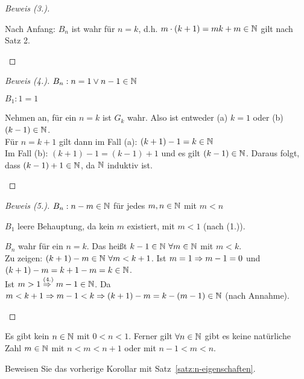 \begin{satz}
\begin{proof}[Beweis (3.)]
\begin{induktionsschritt}
            Nach Anfang: $B_n$ ist wahr für $n=k$, d.h. $m\cdot(k+1) = mk + m \in\mathbb{N}$ gilt nach Satz 2.\qedhere
        \end{induktionsschritt}
    \end{proof}
    \begin{proof}[Beweis (4.)]
        $B_n: n= 1 \lor n-1\in\mathbb{N}$\\
        \begin{induktionsanfang}
            $B_1: 1=1$
        \end{induktionsanfang}
        \begin{induktionsschritt}
            Nehmen an, für ein $n=k$ ist $G_k$ wahr. Also ist entweder (a) $k=1$ oder (b) $(k-1)\in\mathbb{N}$.\\
            Für $n=k+1$ gilt dann im Fall (a): $(k+1)-1 = k\in\mathbb{N}$\\
            Im Fall (b): $(k+1)-1 = (k-1)+1$ und es gilt $(k-1)\in\mathbb{N}$. Daraus folgt, dass $(k-1)+1\in\mathbb{N}$, da $\mathbb{N}$ induktiv ist.\qedhere
        \end{induktionsschritt}
    \end{proof}
    \begin{proof}[Beweis (5.)]
        $B_n: n-m\in\mathbb{N}$ für jedes $m,n\in\mathbb{N}$ mit $m<n$\\
        \begin{induktionsanfang}
            $B_1$ leere Behauptung, da kein $m$ existiert, mit $m<1$ (nach (1.)).
        \end{induktionsanfang}
        \begin{induktionsschritt}
            $B_n$ wahr für ein $n=k$. Das heißt $k-1\in\mathbb{N}~\forall m\in\mathbb{N}$ mit $m<k$.\\
            Zu zeigen: $(k+1)-m\in\mathbb{N}~\forall m<k+1$. Ist $m=1\Rightarrow{} m-1 = 0$ und $(k+1)-m = k+1-m=k\in\mathbb{N}$.\\
            Ist $m>1 \overset{\text{(4.)}}{\Rightarrow{}} m-1\in\mathbb{N}$. Da $m<k+1 \Rightarrow{} m-1<k \Rightarrow{} (k+1)-m = k-(m-1)\in\mathbb{N}$ (nach Annahme).\qedhere
        \end{induktionsschritt}
    \end{proof}
\end{satz}

\begin{korollar}
    \label{korollar:4.2.7}
    Es gibt kein $n\in\mathbb{N}$ mit $0<n<1$. Ferner gilt $\forall n\in\mathbb{N}$ gibt es keine natürliche Zahl $m\in\mathbb{N}$ mit $n<m<n+1$ oder mit $n-1<m<n$.
\end{korollar}
\begin{uebung}
    Beweisen Sie das vorherige Korollar mit Satz~\ref{satz:n-eigenschaften}.
\end{uebung}

